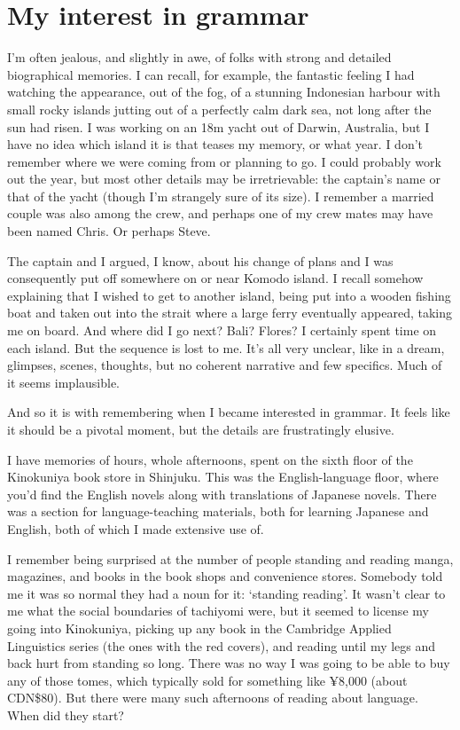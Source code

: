 \section{My interest in grammar}
I'm often jealous, and slightly in awe, of folks with strong and detailed biographical memories. I can recall, for example, the fantastic feeling I had watching the appearance, out of the fog, of a stunning Indonesian harbour with small rocky islands jutting out of a perfectly calm dark sea, not long after the sun had risen. I was working on an 18m yacht out of Darwin, Australia, but I have no idea which island it is that teases my memory, or what year. I don't remember where we were coming from or planning to go. I could probably work out the year, but most other details may be irretrievable: the captain's name or that of the yacht (though I'm strangely sure of its size). I remember a married couple was also among the crew, and perhaps one of my crew mates may have been named Chris. Or perhaps Steve.

The captain and I argued, I know, about his change of plans and I was consequently put off somewhere on or near Komodo island. I recall somehow explaining that I wished to get to another island, being put into a wooden fishing boat and taken out into the strait where a large ferry eventually appeared, taking me on board. And where did I go next? Bali? Flores? I certainly spent time on each island. But the sequence is lost to me. It's all very unclear, like in a dream, glimpses, scenes, thoughts, but no coherent narrative and few specifics. Much of it seems implausible.

And so it is with remembering when I became interested in grammar. It feels like it should be a pivotal moment, but the details are frustratingly elusive.

\bigskip

I have memories of hours, whole afternoons, spent on the sixth floor of the Kinokuniya book store in Shinjuku. This was the English-language floor, where you'd find the English novels along with translations of Japanese novels. There was a section for language-teaching materials, both for learning Japanese and English, both of which I made extensive use of.

I remember being surprised at the number of people standing and reading manga, magazines, and books in the book shops and convenience stores. Somebody told me it was so normal they had a noun for it:  `standing reading'. It wasn't clear to me what the social boundaries of tachiyomi were, but it seemed to license my going into Kinokuniya, picking up any book in the Cambridge Applied Linguistics series (the ones with the red covers), and reading until my legs and back hurt from standing so long. There was no way I was going to be able to buy any of those tomes, which typically sold for something like ¥8,000 (about CDN\$80). But there were many such afternoons of reading about language. When did they start?

